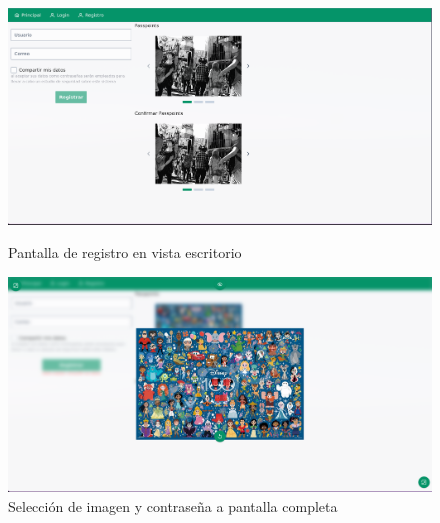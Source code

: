 \begin{anexos}
\begin{figure}[H]
	\centering
\begin{minipage}[b]{0.48\linewidth}  %
	\centering
	\includegraphics[width=\linewidth]{Graphics/capturas/registro-landscape.png}
	\caption{Pantalla de registro en vista escritorio }
	\label{register-screen}
\end{minipage}%
\hfill
\begin{minipage}[b]{0.48\linewidth} %
	\centering
	\includegraphics[width=\linewidth]{Graphics/capturas/fullscreen-password-selector.png}
	\caption{Selecci\'on de imagen y contrase\~na a pantalla completa }   
	\label{full-screen-password}       
\end{minipage}
	
\end{figure} 


\end{anexos}
